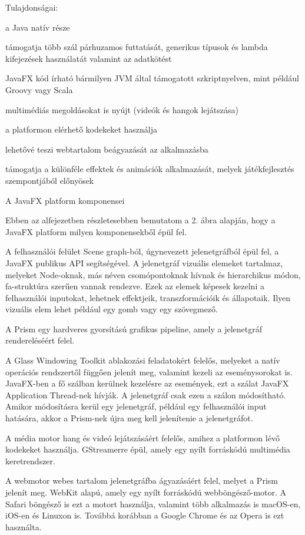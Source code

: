 Tulajdonságai: 

a Java natív része 

támogatja több szál párhuzamos futtatását, generikus típusok és lambda kifejezések használatát valamint az adatkötést 

JavaFX kód írható bármilyen JVM által támogatott szkriptnyelven, mint például Groovy vagy Scala 

multimédiás megoldásokat is nyújt (videók és hangok lejátszása) 

a platformon elérhető kodekeket használja 

lehetővé teszi webtartalom beágyazását az alkalmazásba 

támogatja a különféle effektek és animációk alkalmazását, melyek játékfejlesztés szempontjából előnyösek 

A JavaFX platform komponensei 

Ebben az alfejezetben részletesebben bemutatom a 2. ábra alapján, hogy a JavaFX platform milyen komponensekből épül fel. 


A felhasználói felület Scene graph-ból, úgynevezett jelenetgráfból épül fel, a JavaFX publikus API segítségével. A jelenetgráf vizuális elemeket tartalmaz, melyeket Node-oknak, más néven csomópontoknak hívnak és hierarchikus módon, fa-struktúra szerűen vannak rendezve. Ezek az elemek képesek kezelni a felhasználói inputokat, lehetnek effektjeik, transzformációik és állapotaik. Ilyen vizuális elem lehet például egy gomb vagy egy szövegmező.  

A Prism egy hardveres gyorsítású grafikus pipeline, amely a jelenetgráf rendereléséért felel. 

A Glass Windowing Toolkit ablakozási feladatokért felelős, melyeket a natív operációs rendszertől függően jelenít meg, valamint kezeli az eseménysorokat is. JavaFX-ben a fő szálban kerülnek kezelésre az események, ezt a szálat JavaFX Application Thread-nek hívják. A jelenetgráf csak ezen a szálon módosítható. Amikor módosításra kerül egy jelenetgráf, például egy felhasználói input hatására, akkor a Prism-nek újra meg kell jelenítenie a jelenetgráfot.  

A média motor hang és videó lejátszásáért felelős, amihez a platformon lévő kodekeket használja. GStreamerre épül, amely egy nyílt forráskódú multimédia keretrendszer. 

A webmotor webes tartalom jelenetgráfba ágyazásáért felel, melyet a Prism jelenít meg. WebKit alapú, amely egy nyílt forráskódú webböngésző-motor. A Safari böngésző is ezt a motort használja, valamint több alkalmazás is macOS-en, iOS-en és Linuxon is. Továbbá korábban a Google Chrome és az Opera is ezt használta. 

